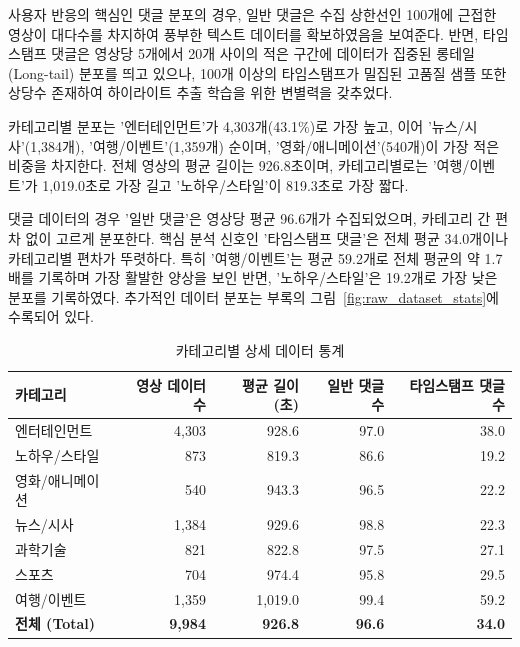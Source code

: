 \documentclass[11pt,a4paper]{article}
\begin{document}
사용자 반응의 핵심인 댓글 분포의 경우, 일반 댓글은 수집 상한선인 100개에 근접한 영상이 대다수를 차지하여 풍부한 텍스트 데이터를 확보하였음을 보여준다. 반면, 타임스탬프 댓글은 영상당 5개에서 20개 사이의 적은 구간에 데이터가 집중된 롱테일(Long-tail) 분포를 띄고 있으나, 100개 이상의 타임스탬프가 밀집된 고품질 샘플 또한 상당수 존재하여 하이라이트 추출 학습을 위한 변별력을 갖추었다.

카테고리별 분포는 '엔터테인먼트'가 4,303개(43.1\%)로 가장 높고, 이어 '뉴스/시사'(1,384개), '여행/이벤트'(1,359개) 순이며, '영화/애니메이션'(540개)이 가장 적은 비중을 차지한다. 전체 영상의 평균 길이는 926.8초이며, 카테고리별로는 '여행/이벤트'가 1,019.0초로 가장 길고 '노하우/스타일'이 819.3초로 가장 짧다.

댓글 데이터의 경우 '일반 댓글'은 영상당 평균 96.6개가 수집되었으며, 카테고리 간 편차 없이 고르게 분포한다. 핵심 분석 신호인 '타임스탬프 댓글'은 전체 평균 34.0개이나 카테고리별 편차가 뚜렷하다. 특히 '여행/이벤트'는 평균 59.2개로 전체 평균의 약 1.7배를 기록하며 가장 활발한 양상을 보인 반면, '노하우/스타일'은 19.2개로 가장 낮은 분포를 기록하였다. 추가적인 데이터 분포는 부록의 그림~\ref{fig:raw_dataset_stats}에 수록되어 있다.


\begin{table}[htbp]
  \centering
  \caption{카테고리별 상세 데이터 통계}
  \vspace{3mm}
  \begin{tabular}{lrrrr}
    \toprule
    \textbf{카테고리} & \textbf{영상 데이터 수} & \textbf{평균 길이(초)} & \textbf{일반 댓글 수} & \textbf{타임스탬프 댓글 수} \\
    \midrule
    엔터테인먼트 & 4,303 & 928.6 & 97.0 & 38.0 \\
    노하우/스타일 & 873 & 819.3 & 86.6 & 19.2 \\
    영화/애니메이션 & 540 & 943.3 & 96.5 & 22.2 \\
    뉴스/시사 & 1,384 & 929.6 & 98.8 & 22.3 \\
    과학기술 & 821 & 822.8 & 97.5 & 27.1 \\
    스포츠 & 704 & 974.4 & 95.8 & 29.5 \\
    여행/이벤트 & 1,359 & 1,019.0 & 99.4 & 59.2 \\
    \midrule
    \textbf{전체 (Total)} & \textbf{9,984} & \textbf{926.8} & \textbf{96.6} & \textbf{34.0} \\
    \bottomrule
  \end{tabular}
  \label{tab:category_stats}
\end{table}
\end{document}
